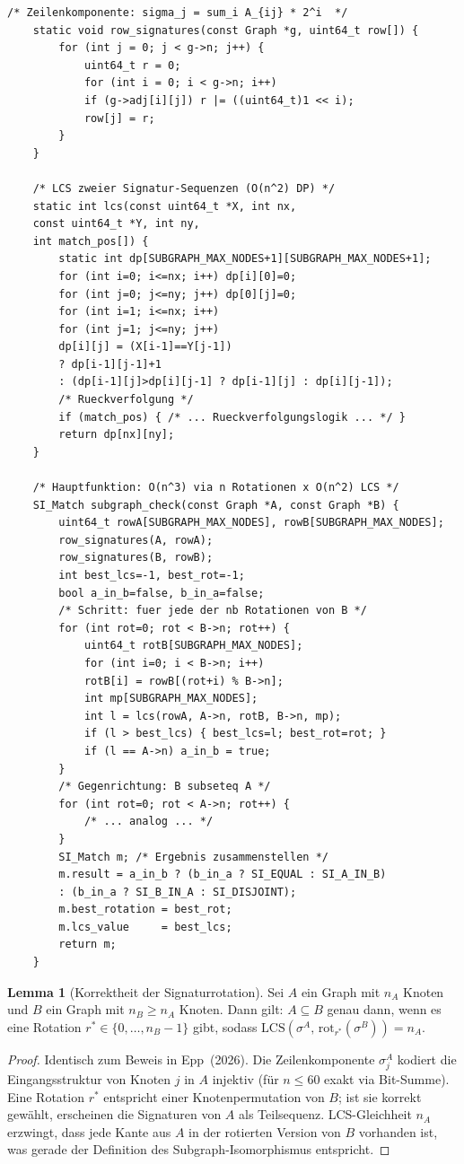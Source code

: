 ﻿\documentclass[a4paper,12pt]{article}
\theoremstyle{definition}
\newtheorem{lemma}{Lemma}
\begin{document}
\begin{lstlisting}[style=cstyle, caption={Signaturfunktion und LCS-Kern
		(subgraph.c)}, label=lst:subgraph-kern]
	/* Zeilenkomponente: sigma_j = sum_i A_{ij} * 2^i  */
	static void row_signatures(const Graph *g, uint64_t row[]) {
		for (int j = 0; j < g->n; j++) {
			uint64_t r = 0;
			for (int i = 0; i < g->n; i++)
			if (g->adj[i][j]) r |= ((uint64_t)1 << i);
			row[j] = r;
		}
	}
	
	/* LCS zweier Signatur-Sequenzen (O(n^2) DP) */
	static int lcs(const uint64_t *X, int nx,
	const uint64_t *Y, int ny,
	int match_pos[]) {
		static int dp[SUBGRAPH_MAX_NODES+1][SUBGRAPH_MAX_NODES+1];
		for (int i=0; i<=nx; i++) dp[i][0]=0;
		for (int j=0; j<=ny; j++) dp[0][j]=0;
		for (int i=1; i<=nx; i++)
		for (int j=1; j<=ny; j++)
		dp[i][j] = (X[i-1]==Y[j-1])
		? dp[i-1][j-1]+1
		: (dp[i-1][j]>dp[i][j-1] ? dp[i-1][j] : dp[i][j-1]);
		/* Rueckverfolgung */
		if (match_pos) { /* ... Rueckverfolgungslogik ... */ }
		return dp[nx][ny];
	}
	
	/* Hauptfunktion: O(n^3) via n Rotationen x O(n^2) LCS */
	SI_Match subgraph_check(const Graph *A, const Graph *B) {
		uint64_t rowA[SUBGRAPH_MAX_NODES], rowB[SUBGRAPH_MAX_NODES];
		row_signatures(A, rowA);
		row_signatures(B, rowB);
		int best_lcs=-1, best_rot=-1;
		bool a_in_b=false, b_in_a=false;
		/* Schritt: fuer jede der nb Rotationen von B */
		for (int rot=0; rot < B->n; rot++) {
			uint64_t rotB[SUBGRAPH_MAX_NODES];
			for (int i=0; i < B->n; i++)
			rotB[i] = rowB[(rot+i) % B->n];
			int mp[SUBGRAPH_MAX_NODES];
			int l = lcs(rowA, A->n, rotB, B->n, mp);
			if (l > best_lcs) { best_lcs=l; best_rot=rot; }
			if (l == A->n) a_in_b = true;
		}
		/* Gegenrichtung: B subseteq A */
		for (int rot=0; rot < A->n; rot++) {
			/* ... analog ... */
		}
		SI_Match m; /* Ergebnis zusammenstellen */
		m.result = a_in_b ? (b_in_a ? SI_EQUAL : SI_A_IN_B)
		: (b_in_a ? SI_B_IN_A : SI_DISJOINT);
		m.best_rotation = best_rot;
		m.lcs_value     = best_lcs;
		return m;
	}
\end{lstlisting}

\begin{lemma}[Korrektheit der Signaturrotation]
	\label{lem:rotation}
	Sei $A$ ein Graph mit $n_A$ Knoten und $B$ ein Graph mit $n_B \geq n_A$
	Knoten. Dann gilt: $A \subseteq B$ genau dann, wenn es eine Rotation
	$r^* \in \{0, \ldots, n_B - 1\}$ gibt, sodass
	$\mathrm{LCS}(\sigma^A,\, \mathrm{rot}_{r^*}(\sigma^B)) = n_A$.
\end{lemma}

\begin{proof}
	Identisch zum Beweis in Epp~(2026). Die Zeilenkomponente $\sigma_j^A$
	kodiert die Eingangsstruktur von Knoten $j$ in $A$ injektiv (für $n \leq 60$
	exakt via Bit-Summe). Eine Rotation $r^*$ entspricht einer Knotenpermutation
	von $B$; ist sie korrekt gewählt, erscheinen die Signaturen von $A$ als
	Teilsequenz. LCS-Gleichheit $n_A$ erzwingt, dass jede Kante aus $A$ in der
	rotierten Version von $B$ vorhanden ist, was gerade der Definition des
	Subgraph-Isomorphismus entspricht.
\end{proof}
\end{document}
